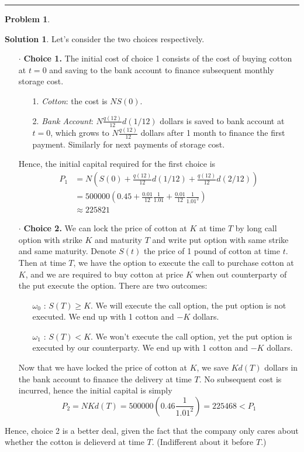 \documentclass[a4paper, 10pt]{article}
\theoremstyle{definition}
\newtheorem{problem}{Problem}
\theoremstyle{hSol}
\newtheorem*{solution}{Solution}
\begin{document}
\noindent\rule{16cm}{0.4pt}
\begin{problem} 
\end{problem}
\begin{solution} Let's consider the two choices respectively.
\begin{itemize}
  \item[$\cdot$] \textbf{Choice 1.} The initial cost of choice 1 consists of the cost of buying cotton at $t=0$ and saving to the bank account to finance subsequent monthly storage cost. 
  \begin{itemize}
    \item[1.] \textit{Cotton}: the cost is $NS(0)$.
    \item[2.] \textit{Bank Account}: $N\frac{q(12)}{12}d(1/12)$ dollars is saved to bank account at $t=0$, which grows to $N\frac{q(12)}{12}$ dollars after 1 month to finance the first payment. Similarly for next payments of storage cost.
  \end{itemize}
  Hence, the initial capital required for the first choice is
  \begin{equation}
    \begin{split}
        P_1 &= N\left(S(0) + \frac{q(12)}{12}d(1/12) + \frac{q(12)}{12}d(2/12)\right) \\
        & = 500000\left(0.45+\frac{0.01}{12}\frac{1}{1.01}+\frac{0.01}{12}\frac{1}{1.01^2}\right)\\
        &\approx 225821
    \end{split}
  \end{equation}
  \item[$\cdot$] \textbf{Choice 2.} We can lock the price of cotton at $K$ at time $T$ by long call option with strike $K$ and maturity $T$ and write put option with same strike and same maturity. Denote $S(t)$ the price of 1 pound of cotton at time $t$. Then at time $T$, we have the option to execute the call to purchase cotton at $K$, and we are required to buy cotton at price $K$ when out counterparty of the put execute the option. There are two outcomes:
  \begin{itemize}
    \item[$\omega_0$]: $S(T) \geq K$. We will execute the call option, the put option is not executed. We end up with 1 cotton and $-K$ dollars.
    \item[$\omega_1$]: $S(T) < K$. We won't execute the call option, yet the put option is executed by our counterparty. We end up with 1 cotton and $-K$ dollars.
  \end{itemize}
  Now that we have locked the price of cotton at $K$, we save $Kd(T)$ dollars in the bank account to finance the delivery at time $T$. No subsequent cost is incurred, hence the initial capital is simply
  $$
  P_2 = NKd(T) = 500000\left(0.46\frac{1}{1.01^2}\right) = 225468 < P_1
  $$
\end{itemize}
Hence, choice 2 is a better deal, given the fact that the company only cares about whether the cotton is delieverd at time $T$. (Indifferent about it before $T$.)
\end{solution}
\end{document}

